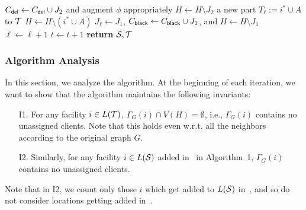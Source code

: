 \begin{algorithm}
\begin{algorithmic}[1]
\State $C_{\mathsf{del}} \gets C_{\mathsf{del}} \cup J_2$ and augment $\phi$ appropriately  \label{alg:phi2}
\State $H \gets H \setminus J_2$
 a new part $T_\ell := i^* \cup A$ to ${\cal T}$  \label{alg:case2b}
\State $H \gets H \setminus (i^* \cup A)$ 
\State $J_\ell \gets J_1$, $C_{\mathsf{black}} \gets C_{\mathsf{black}} \cup J_1$, and $H \gets H \setminus J_1$  \label{alg:color2}
\State $\ell \gets \ell + 1$
\EndIf
\State $t \gets t+1 $ 
\EndWhile\label{euclidendwhile}
\State \textbf{return} ${\cal S},{\cal T}$
\EndProcedure
\end{algorithmic}
\end{algorithm}
\subsubsection{Algorithm Analysis}
In this section, we analyze the algorithm.
\medskip \noindent
At the beginning of each iteration, we want to show that the algorithm maintains the following invariants:
\begin{framed}
\begin{enumerate}%
	\item[I1.] For any facility $i\in L({\cal T})$, $\Gamma_G(i) \cap V(H) = \emptyset$, i.e., $\Gamma_G(i)$  contains no unassigned clients. Note that this holds even w.r.t. all the neighbors according to the original graph $G$.
\item[I2.] Similarly, for any facility $i \in L({\cal S})$  added in~ in Algorithm~1, $\Gamma_G(i)$ contains no unassigned clients.
\end{enumerate}
\end{framed}
Note that in I2, we count only those $i$ which get added to $L({\cal S})$ in~, and so do not consider locations getting added in~.

